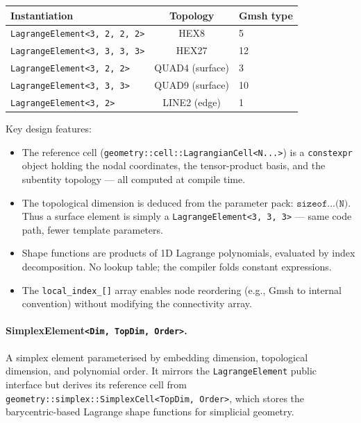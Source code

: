 \begin{center}
\small
\begin{tabular}{lcl}
  \toprule
  Instantiation & Topology & Gmsh type \\
  \midrule
  \texttt{LagrangeElement<3, 2, 2, 2>} & HEX8  & 5 \\
  \texttt{LagrangeElement<3, 3, 3, 3>} & HEX27 & 12 \\
  \texttt{LagrangeElement<3, 2, 2>}    & QUAD4 (surface) & 3 \\
  \texttt{LagrangeElement<3, 3, 3>}    & QUAD9 (surface) & 10 \\
  \texttt{LagrangeElement<3, 2>}       & LINE2 (edge)    & 1 \\
  \bottomrule
\end{tabular}
\end{center}

Key design features:
\begin{itemize}[nosep]
  \item The reference cell (\texttt{geometry::cell::LagrangianCell<N...>}) is a
        \texttt{constexpr} object holding the nodal coordinates, the
        tensor-product basis, and the subentity topology --- all computed at
        compile time.
  \item The topological dimension is deduced from the parameter pack:
        $\texttt{sizeof...(N)}$.  Thus a surface element is simply a
        \texttt{LagrangeElement<3, 3, 3>} --- same code path, fewer
        template parameters.
  \item Shape functions are products of 1D Lagrange polynomials, evaluated by
        index decomposition.  No lookup table; the compiler folds constant
        expressions.
  \item The \texttt{local\_index\_[]} array enables node reordering (e.g., Gmsh
        to internal convention) without modifying the connectivity array.
\end{itemize}

\paragraph{SimplexElement\texttt{<Dim, TopDim, Order>}.}
A simplex element parameterised by embedding dimension, topological dimension,
and polynomial order.  It mirrors the \texttt{LagrangeElement} public
interface but derives its reference cell from
\texttt{geometry::simplex::SimplexCell<TopDim, Order>}, which stores the
barycentric-based Lagrange shape functions for simplicial geometry.

